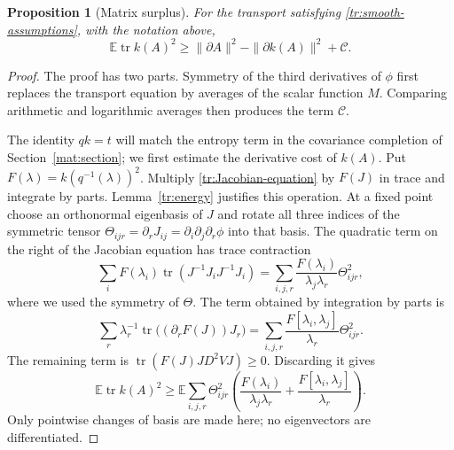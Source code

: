 \documentclass[11pt]{article}
\newtheorem{proposition}[theorem]{Proposition}
\theoremstyle{definition}
\theoremstyle{remark}
\numberwithin{equation}{section}
\begin{document}
\begin{proposition}[Matrix surplus]\label{tr:surplus}
For the transport satisfying \eqref{tr:smooth-assumptions}, with the
notation above,
\begin{equation}\label{tr:surplus-inequality}
 \mathbb E\operatorname{tr}k(A)^2
 \ge\|\partial A\|^2-\|\partial k(A)\|^2+\mathcal C.
\end{equation}
\end{proposition}
\begin{proof}
The proof has two parts.  Symmetry of the third derivatives of $\phi$
first replaces the transport equation by averages of the scalar
function $M$.  Comparing arithmetic and logarithmic averages then
produces the term $\mathcal C$.

The identity $qk=t$ will match the entropy term in the covariance
completion of Section~\ref{mat:section}; we first estimate the derivative
cost of $k(A)$. Put $F(\lambda)=k(q^{-1}(\lambda))^2$. Multiply
\eqref{tr:Jacobian-equation} by $F(J)$ in trace and integrate by parts.
Lemma~\ref{tr:energy} justifies this operation.  At a fixed point
choose an orthonormal eigenbasis of $J$ and rotate all three indices
of the symmetric tensor
$\Theta_{ijr}=\partial_rJ_{ij}=\partial_i\partial_j\partial_r\phi$
into that basis.  The quadratic term on the right of the Jacobian
equation has trace contraction
\[
 \sum_i F(\lambda_i)\operatorname{tr}(J^{-1}J_iJ^{-1}J_i)
 =\sum_{i,j,r}\frac{F(\lambda_i)}{\lambda_j\lambda_r}\Theta_{ijr}^2,
\]
where we used the symmetry of $\Theta$.  The term obtained by integration
by parts is
\[
 \sum_r\lambda_r^{-1}\operatorname{tr}\bigl((\partial_rF(J))J_r\bigr)
 =\sum_{i,j,r}\frac{F[\lambda_i,\lambda_j]}{\lambda_r}\Theta_{ijr}^2.
\]
The remaining term is
$\operatorname{tr}(F(J)JD^2VJ)\ge0$.
Discarding it gives
\begin{equation}\label{tr:initial-multiplier}
 \mathbb E\operatorname{tr}k(A)^2
 \ge\mathbb E\sum_{i,j,r}\Theta_{ijr}^2
 \left(\frac{F(\lambda_i)}{\lambda_j\lambda_r}
             +\frac{F[\lambda_i,\lambda_j]}{\lambda_r}\right).
\end{equation}
Only pointwise changes of basis are made here; no eigenvectors are
differentiated.


\end{proof}
\end{document}
